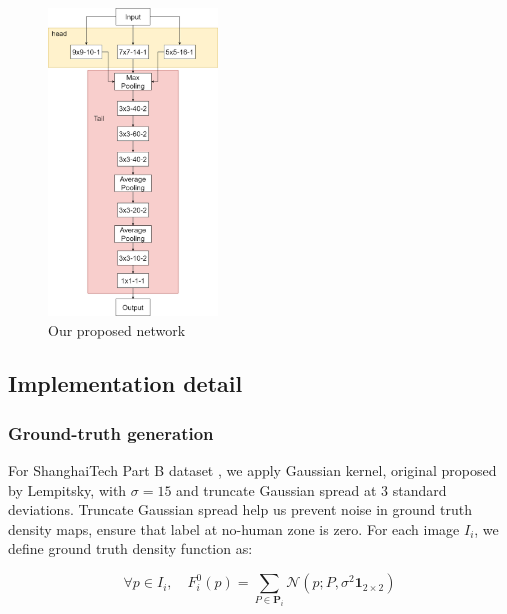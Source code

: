 

\begin{figure}[htbp]
\centerline{\includegraphics[width=0.4\textwidth]{Picture/proposed/tail13_fix2.png}}
\caption{Our proposed network}
\label{fig:dccnn}
\end{figure}



\subsection{Implementation detail}

\subsubsection{Ground-truth generation} \hfill

For ShanghaiTech Part B dataset \cite{zhang2016single}, we apply Gaussian kernel, original proposed by Lempitsky, \cite{lempitsky2010learning} with $\sigma = 15$ and truncate Gaussian spread at 3 standard deviations. Truncate Gaussian spread help us prevent noise in ground truth density maps, ensure that label at no-human zone is zero. For each image $I_i$, we define ground truth density function as: 

\begin{equation} \label{eq:densit-function}
\forall p \in I_{i}, \quad F_{i}^{0}(p)=\sum_{P \in \mathbf{P}_{i}} \mathcal{N}\left(p ; P, \sigma^{2} \mathbf{1}_{2 \times 2}\right) 
\end{equation}

